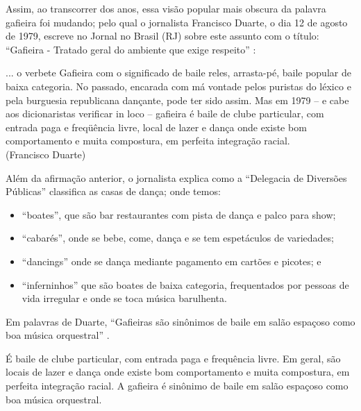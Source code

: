 Assim, ao transcorrer dos anos, essa visão popular mais obscura da palavra gafieira foi mudando;
pelo qual o jornalista Francisco Duarte, o dia 12 de agosto de 1979,
escreve no Jornal no Brasil (RJ) sobre este assunto com o título:
``Gafieira - Tratado geral do ambiente que exige respeito'' \cite[pp. 10]{respeitojournalbrasil1}:
\begin{citando}%
... o verbete Gafieira com o significado de baile reles, arrasta-pé, baile popular de baixa categoria.
No passado, encarada com má vontade pelos puristas do léxico e pela burguesia republicana dançante,
pode ter sido assim. Mas em 1979 -- e cabe aos dicionaristas verificar in loco --
gafieira é baile de clube particular, com entrada paga e freqüência livre, 
local de lazer e dança onde existe bom comportamento e muita compostura,
em perfeita integração racial.\\
(Francisco Duarte)
\end{citando}
Além da afirmação anterior, 
o jornalista explica como a ``Delegacia de Diversões Públicas'' classifica as casas de dança;
onde temos: 
\begin{itemize}
\item ``boates'', que são bar restaurantes com pista de dança e palco para show;
\item ``cabarés'', onde se bebe, come, dança e se tem espetáculos de variedades;
\item ``dancings'' onde se dança mediante pagamento em cartões e picotes; e 
\item ``inferninhos'' que são boates de baixa categoria, 
frequentados por pessoas de vida irregular e onde se toca música barulhenta.
\end{itemize} 
Em palavras de Duarte, ``Gafieiras são sinônimos de baile em salão espaçoso como boa música orquestral'' \cite[pp. 11]{respeitojournalbrasil1}.

\begin{definition}[Gafieira:]
\label{def:Gafieira}
É baile de clube particular, com entrada paga e frequência livre. 
Em geral, são locais de lazer e dança onde existe bom comportamento e muita compostura,
em perfeita integração racial.
A gafieira é sinônimo de baile em salão espaçoso como boa música orquestral.
\end{definition}



